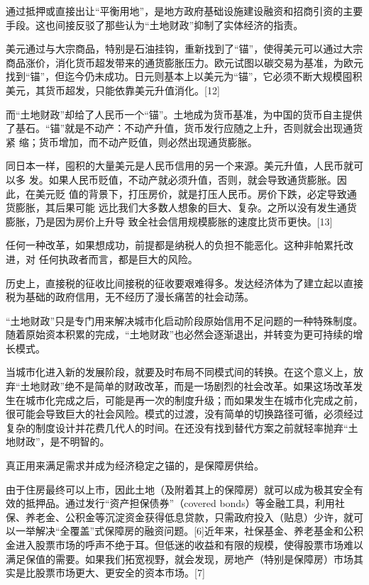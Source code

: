 通过抵押或直接出让“平衡用地”，是地方政府基础设施建设融资和招商引资的主要手段。这也间接反驳了那些认为“土地财政”抑制了实体经济的指责。

美元通过与大宗商品，特别是石油挂钩，重新找到了“锚”，使得美元可以通过大宗商品涨价，消化货币超发带来的通货膨胀压力。欧元试图以碳交易为基准，为欧元找到“锚”，但迄今仍未成功。日元则基本上以美元为“锚”，它必须不断大规模囤积美元，其货币超发，只能依靠美元升值消化。[12]

而“土地财政”却给了人民币一个“锚”。土地成为货币基准，为中国的货币自主提供
了基石。“锚”就是不动产：不动产升值，货币发行应随之上升，否则就会出现通货紧
缩；货币增加，而不动产贬值，则必然出现通货膨胀。

同日本一样，囤积的大量美元是人民币信用的另一个来源。美元升值，人民币就可以多
发。如果人民币贬值，不动产就必须升值，否则，就会导致通货膨胀。因此，在美元贬
值的背景下，打压房价，就是打压人民币。房价下跌，必定导致通货膨胀，其后果可能
远比我们大多数人想象的巨大、复杂。之所以没有发生通货膨胀，乃是因为房价上升导
致全社会信用规模膨胀的速度比货币更快。[13]

任何一种改革，如果想成功，前提都是纳税人的负担不能恶化。这种非帕累托改进，对
任何执政者而言，都是巨大的风险。

历史上，直接税的征收比间接税的征收要艰难得多。发达经济体为了建立起以直接税为基础的政府信用，无不经历了漫长痛苦的社会动荡。

“土地财政”只是专门用来解决城市化启动阶段原始信用不足问题的一种特殊制度。随着原始资本积累的完成，“土地财政”也必然会逐渐退出，并转变为更可持续的增长模式。

当城市化进入新的发展阶段，就要及时布局不同模式间的转换。在这个意义上，放弃“土地财政”绝不是简单的财政改革，而是一场剧烈的社会改革。如果这场改革发生在城市化完成之后，可能是再一次的制度升级；而如果发生在城市化完成之前，很可能会导致巨大的社会风险。模式的过渡，没有简单的切换路径可循，必须经过复杂的制度设计并花费几代人的时间。在还没有找到替代方案之前就轻率抛弃“土地财政”，是不明智的。

真正用来满足需求并成为经济稳定之锚的，是保障房供给。

由于住房最终可以上市，因此土地（及附着其上的保障房）就可以成为极其安全有效的抵押品。通过发行“资产担保债券”（covered bonds）等金融工具，利用社保、养老金、公积金等沉淀资金获得低息贷款，只需政府投入（贴息）少许，就可以一举解决“全覆盖”式保障房的融资问题。[6]近年来，社保基金、养老基金和公积金进入股票市场的呼声不绝于耳。但低迷的收益和有限的规模，使得股票市场难以满足保值的需要。如果我们拓宽视野，就会发现，房地产（特别是保障房）市场其实是比股票市场更大、更安全的资本市场。[7]

